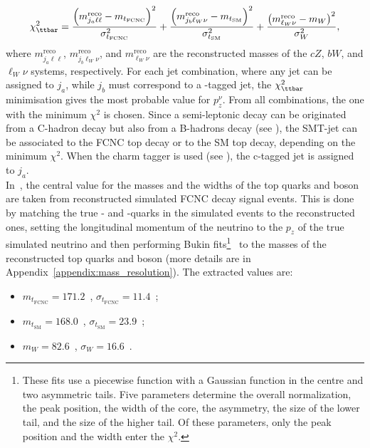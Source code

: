 \begin{equation}
\chi^2_{\ttbar}  =  \frac{\left(m^{\mathrm{reco}}_{j_a\ell\ell}-m_{t_{\mathrm{FCNC}}}\right)^2}{\sigma_{t_{\mathrm{FCNC}}}^2}+
\frac{\left(m^{\mathrm{reco}}_{j_b\ell_W\nu}-m_{t_{\mathrm{SM}}}\right)^2}{\sigma_{t_{\mathrm{SM}}}^2}
+ \frac{\left(m^{\mathrm{reco}}_{\ell_W\nu}-m_W\right)^2}{\sigma_W^2},
\label{eq:chi2tt}
\end{equation}
where $m^{\mathrm{reco}}_{j_a\ell\ell}$, 
$m^{\mathrm{reco}}_{j_b\ell_W\nu}$, and $m^{\mathrm{reco}}_{\ell_W\nu}$ are 
the reconstructed masses of the $cZ$, $bW$, and $\ell_W\nu$ systems, respectively.
For each jet combination, where any jet can be assigned to $j_a$, while $j_b$ must correspond to a \Pqb-tagged jet, the $\chi^2_{\ttbar}$ minimisation gives the most probable value for $p^{\nu}_z$. From all combinations, the one with the minimum $\chi^2$ is chosen.
Since a semi-leptonic decay can be originated from a C-hadron decay but also from a B-hadrons decay (see ), the SMT-jet can be associated to the FCNC top decay or to the SM top decay, depending on the minimum $\chi^2$. When the \DLrc charm tagger is used (see ), the c-tagged jet is assigned to $j_a$.
\\ In~, the central value for the masses and the widths of the top quarks and \PW boson are taken from reconstructed simulated FCNC \ttbar decay signal events. This is done by matching the true \Pqc- and \Pqb-quarks in the simulated events to the reconstructed ones, setting the longitudinal momentum of the neutrino to the $p_z$ of the true simulated neutrino and then performing Bukin fits\footnote{These fits use a piecewise function with  a Gaussian function in the centre and two 		
	asymmetric tails. Five parameters determine the overall normalization, the peak position, the width of the core, the asymmetry, the size of the lower tail, and the size of the higher tail. Of these parameters, only the peak position and the width enter the $\chi^2$.}~\cite{Bukin} 
to the masses of the reconstructed top quarks and \PW boson (more details are in Appendix~\ref{appendix:mass_resolution}). 
The extracted values are: 
\begin{itemize}
	\item $m_{t_{\mathrm{FCNC}}}=171.2$~\GeV,  $\sigma_{t_{\mathrm{FCNC}}}=11.4$~\GeV;
	\item $m_{t_{\mathrm{SM}}}=168.0$~\GeV,  $\sigma_{t_{\mathrm{SM}}}=23.9$~\GeV;
	\item $m_W=82.6$~\GeV,  $\sigma_W=16.6$~\GeV.
\end{itemize}	
